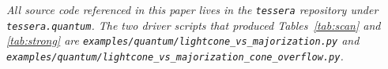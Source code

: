 \documentclass[11pt,a4paper]{article}
\theoremstyle{definition}
\theoremstyle{plain}
\theoremstyle{remark}
\begin{document}
\bigskip

\noindent\emph{All source code referenced in this paper lives in the
\texttt{tessera} repository under \texttt{tessera.quantum}.  The two
driver scripts that produced Tables~\ref{tab:scan} and
\ref{tab:strong} are
\texttt{examples/quantum/lightcone\_vs\_majorization.py} and
\texttt{examples/quantum/lightcone\_vs\_majorization\_cone\_overflow.py}.}
\end{document}
